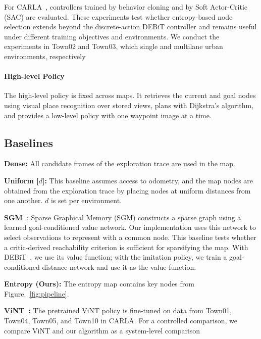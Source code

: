 For CARLA~\cite{dosovitskiy2017carla}, controllers trained by
behavior cloning and by
Soft Actor-Critic (SAC) are evaluated. These experiments test
whether entropy-based node selection extends beyond
the discrete-action DEBiT controller and remains
useful under different training objectives and environments.
We conduct the experiments in Town02 and Town03, which single and multilane urban environments, respectively

\paragraph{High-level Policy}
The high-level policy is fixed across maps. It retrieves the
current and goal nodes using  visual place recognition over
stored views, plans with Dijkstra's algorithm, and
provides a low-level policy with one waypoint image at a time.

\subsection{Baselines}
\textbf{Dense:}
All candidate frames of the exploration trace are used in the map.

\textbf{Uniform [$d$]:}
This baseline assumes access to odometry, and the map nodes are obtained from the exploration trace by placing nodes at uniform distances from one another. $d$ is set per environment.

\textbf{SGM~\cite{emmons2020sparse}}:
Sparse Graphical Memory (SGM) constructs a sparse graph using a learned goal-conditioned value network. Our implementation uses this network to select observations to represent with a common node. This baseline tests whether a critic-derived reachability criterion is sufficient for sparsifying the map. With DEBiT~\cite{bono2024end}, we use its value function; with the imitation policy, we train a goal-conditioned distance network and use it as the value function.

\textbf{Entropy (Ours):}
The entropy map contains key nodes from Figure.~\ref{fig:pipeline}.

\textbf{ViNT~\cite{shah2023vint}:}
The pretrained ViNT policy is fine-tuned on data from Town01, Town04, Town05, and Town10 in CARLA.
For a controlled comparison, we compare ViNT and our algorithm as a system-level comparison


